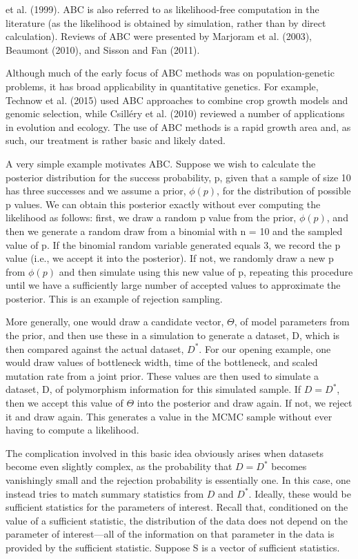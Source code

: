 \documentclass{article}
\begin{document}
et al. (1999). ABC is also referred to as likelihood-free computation in the literature (as the likelihood is obtained by simulation, rather than by direct calculation). Reviews of ABC were presented by Marjoram et al. (2003), Beaumont (2010), and Sisson and Fan (2011).

Although much of the early focus of ABC methods was on population-genetic problems, it has broad applicability in quantitative genetics. For example, Technow et al. (2015) used ABC approaches to combine crop growth models and genomic selection, while Csilléry et al. (2010) reviewed a number of applications in evolution and ecology. The use of ABC methods is a rapid growth area and, as such, our treatment is rather basic and likely dated.

A very simple example motivates ABC. Suppose we wish to calculate the posterior distribution for the success probability, p, given that a sample of size 10 has three successes and we assume a prior,  $ \phi(p) $, for the distribution of possible p values. We can obtain this posterior exactly without ever computing the likelihood as follows: first, we draw a random p value from the prior,  $ \phi(p) $, and then we generate a random draw from a binomial with n = 10 and the sampled value of p. If the binomial random variable generated equals 3, we record the p value (i.e., we accept it into the posterior). If not, we randomly draw a new p from  $ \phi(p) $ and then simulate using this new value of p, repeating this procedure until we have a sufficiently large number of accepted values to approximate the posterior. This is an example of rejection sampling.

More generally, one would draw a candidate vector,  $ \Theta $, of model parameters from the prior, and then use these in a simulation to generate a dataset, D, which is then compared against the actual dataset,  $ D^{*} $. For our opening example, one would draw values of bottleneck width, time of the bottleneck, and scaled mutation rate from a joint prior. These values are then used to simulate a dataset, D, of polymorphism information for this simulated sample. If  $ D = D^{*} $, then we accept this value of  $ \Theta $ into the posterior and draw again. If not, we reject it and draw again. This generates a value in the MCMC sample without ever having to compute a likelihood.

The complication involved in this basic idea obviously arises when datasets become even slightly complex, as the probability that  $ D = D^{*} $ becomes vanishingly small and the rejection probability is essentially one. In this case, one instead tries to match summary statistics from  $ D $ and  $ D^{*} $. Ideally, these would be sufficient statistics for the parameters of interest. Recall that, conditioned on the value of a sufficient statistic, the distribution of the data does not depend on the parameter of interest—all of the information on that parameter in the data is provided by the sufficient statistic. Suppose S is a vector of sufficient statistics.
\end{document}
